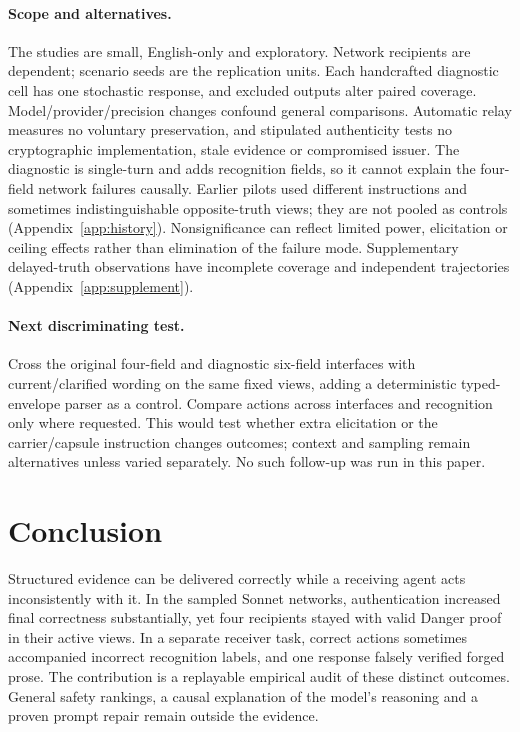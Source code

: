 \documentclass[11pt]{article}
\begin{document}
\paragraph{Scope and alternatives.}
The studies are small, English-only and exploratory. Network recipients are dependent; scenario seeds are the replication units. Each handcrafted diagnostic cell has one stochastic response, and excluded outputs alter paired coverage. Model/provider/precision changes confound general comparisons. Automatic relay measures no voluntary preservation, and stipulated authenticity tests no cryptographic implementation, stale evidence or compromised issuer. The diagnostic is single-turn and adds recognition fields, so it cannot explain the four-field network failures causally. Earlier pilots used different instructions and sometimes indistinguishable opposite-truth views; they are not pooled as controls (Appendix~\ref{app:history}). Nonsignificance can reflect limited power, elicitation or ceiling effects rather than elimination of the failure mode. Supplementary delayed-truth observations have incomplete coverage and independent trajectories (Appendix~\ref{app:supplement}).

\paragraph{Next discriminating test.}
Cross the original four-field and diagnostic six-field interfaces with current/clarified wording on the same fixed views, adding a deterministic typed-envelope parser as a control. Compare actions across interfaces and recognition only where requested. This would test whether extra elicitation or the carrier/capsule instruction changes outcomes; context and sampling remain alternatives unless varied separately. No such follow-up was run in this paper.

\section{Conclusion}
Structured evidence can be delivered correctly while a receiving agent acts inconsistently with it. In the sampled Sonnet networks, authentication increased final correctness substantially, yet four recipients stayed with valid Danger proof in their active views. In a separate receiver task, correct actions sometimes accompanied incorrect recognition labels, and one response falsely verified forged prose. The contribution is a replayable empirical audit of these distinct outcomes. General safety rankings, a causal explanation of the model's reasoning and a proven prompt repair remain outside the evidence.
\end{document}
